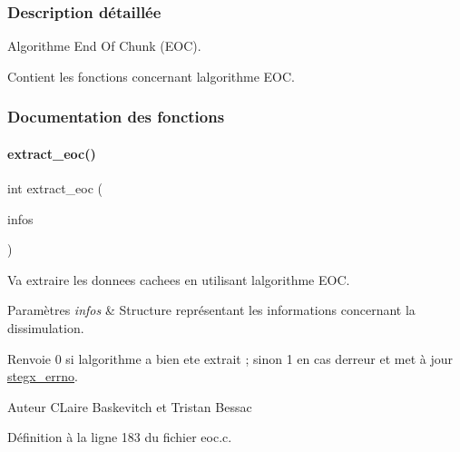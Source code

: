 \subsubsection{Description détaillée}
Algorithme End Of Chunk (E\+OC). 

Contient les fonctions concernant l\textquotesingle{}algorithme E\+OC. 

\subsubsection{Documentation des fonctions}
\mbox{\label{a00014_ad0cda2ae23fda82b16083952ca1b698a}} 
\paragraph{\texorpdfstring{extract\+\_\+eoc()}{extract\_eoc()}}
{\footnotesize\ttfamily int extract\+\_\+eoc (\begin{DoxyParamCaption}\item[{\hyperlink{a00008_aa8ca908d92fb5bdd3c0a9e1f58b2cf03}{info\+\_\+s} $\ast$}]{infos }\end{DoxyParamCaption})}



Va extraire les donnees cachees en utilisant l\textquotesingle{}algorithme E\+OC. 


\begin{DoxyParams}{Paramètres}
{\em infos} & Structure représentant les informations concernant la dissimulation. \\
\hline
\end{DoxyParams}
\begin{DoxyReturn}{Renvoie}
0 si l\textquotesingle{}algorithme a bien ete extrait ; sinon 1 en cas d\textquotesingle{}erreur et met à jour \hyperlink{a00062_a5ec48ccdfbe19fe23855818f8556abec}{stegx\+\_\+errno}. 
\end{DoxyReturn}
\begin{DoxyAuthor}{Auteur}
C\+Laire Baskevitch et Tristan Bessac 
\end{DoxyAuthor}


Définition à la ligne 183 du fichier eoc.\+c.

